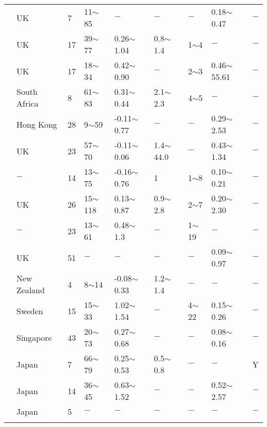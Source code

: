 {\begin{longtable}{lllllllll}
    \citet{Simons1976183} & UK    & 7     & 11$\sim$85 & $-$     & $-$     & $-$     & 0.18$\sim$0.47 & $-$ \\
    \citet{Skempton1948145} & UK    & 17    & 39$\sim$77 & 0.26$\sim$1.04 & 0.8$\sim$1.4 & 1$\sim$4   & $-$     & $-$ \\
    \citet{Skempton1948111} & UK    & 17    & 18$\sim$34 & 0.42$\sim$0.90 & $-$     & 2$\sim$3   & 0.46$\sim$55.61 & $-$ \\
    \citet{Skempton1950304} & South Africa & 8     & 61$\sim$83 & 0.31$\sim$0.44 & 2.1$\sim$2.3 & 4$\sim$5   & $-$     & $-$ \\
    \citet{Skempton1957305} & Hong Kong & 28    & 9$\sim$59  & -0.11$\sim$0.77 & $-$     & $-$     & 0.29$\sim$2.53 & $-$ \\
    \citet{Skempton1961351} & UK    & 23    & 57$\sim$70 & -0.11$\sim$0.06 & 1.4$\sim$44.0 & $-$     & 0.43$\sim$1.34 & $-$ \\
    \citet{Skempton1954417} & $-$     & 14    & 13$\sim$75 & -0.16$\sim$0.76 & 1     & 1$\sim$8   & 0.10$\sim$0.21 & $-$ \\
    \citet{Skempton1953302} & UK    & 26    & 15$\sim$118 & 0.13$\sim$0.87 & 0.9$\sim$2.8 & 2$\sim$7   & 0.20$\sim$2.30 & $-$ \\
    \citet{Skempton195330} & $-$     & 23    & 13$\sim$61 & 0.48$\sim$1.3 & $-$     & 1$\sim$19  & $-$     & $-$ \\
    \citet{Skempton1963269} & UK    & 51    & $-$     & $-$     & $-$     & $-$     & 0.09$\sim$0.97 & $-$ \\
    \citet{Strachan1960135} & New Zealand & 4     & 8$\sim$14  & -0.08$\sim$0.33 & 1.2$\sim$1.4 & $-$     & $-$     & $-$ \\
    \citet{Stille1979285} & Sweden & 15    & 15$\sim$33 & 1.02$\sim$1.54 & $-$     & 4$\sim$22  & 0.15$\sim$0.26 & $-$ \\
    \citet{Tan2003429} & Singapore & 43    & 20$\sim$73 & 0.27$\sim$0.68 & $-$     & $-$     & 0.08$\sim$0.16 & $-$ \\
    \citet{Tanaka1989563} & Japan & 7     & 66$\sim$79 & 0.25$\sim$0.53 & 0.5$\sim$0.8 & $-$     & $-$     & Y \\
    \citet{Tanaka2003455} & Japan & 14    & 36$\sim$45 & 0.63$\sim$1.52 & $-$     & $-$     & 0.52$\sim$2.57 & $-$ \\
    \citet{Tani199537} & Japan & 5     & $-$     & $-$     & $-$     & $-$     & $-$     & $-$ \\
    \label{table:7}%
\end{longtable}}